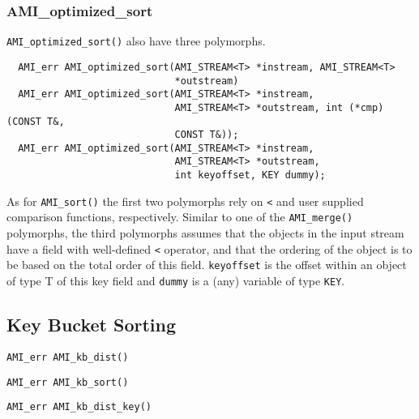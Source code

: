 \subsubsection{AMI\_optimized\_sort}

\verb|AMI_optimized_sort()| also have three polymorphs.

\begin{verbatim}
  AMI_err AMI_optimized_sort(AMI_STREAM<T> *instream, AMI_STREAM<T>
                             *outstream) 
  AMI_err AMI_optimized_sort(AMI_STREAM<T> *instream,
                             AMI_STREAM<T> *outstream, int (*cmp)(CONST T&,
                             CONST T&)); 
  AMI_err AMI_optimized_sort(AMI_STREAM<T> *instream,
                             AMI_STREAM<T> *outstream, 
                             int keyoffset, KEY dummy);
\end{verbatim}

As for \verb|AMI_sort()| the first two polymorphs rely on \verb|<| and user
supplied comparison functions, respectively. Similar to one of the
\verb|AMI_merge()| polymorphs, the third polymorphs assumes that the
objects in the input stream have a field with well-defined \verb|<|
operator, and that the ordering of the object is to be based on the total
order of this field. \verb|keyoffset| is the offset within an object of
type T of this key field and \verb|dummy| is a (any) variable of type
\verb|KEY|.

\subsection{Key Bucket Sorting}
\label{sec:ref-ami-kb-sort}


\tobeextended

\begin{verbatim}
AMI_err AMI_kb_dist()
\end{verbatim}

\begin{verbatim}
AMI_err AMI_kb_sort()
\end{verbatim}

\begin{verbatim}
AMI_err AMI_kb_dist_key()
\end{verbatim}

